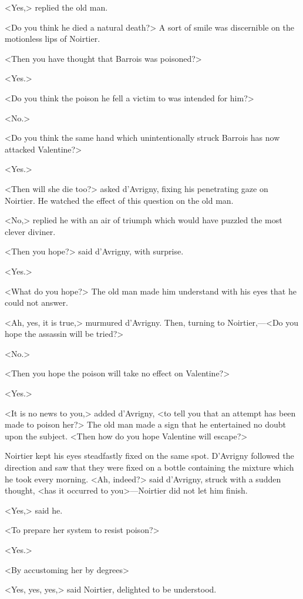  <Yes,> replied the old man. 

 <Do you think he died a natural death?> A sort of smile was discernible on the motionless lips of Noirtier. 

 <Then you have thought that Barrois was poisoned?> 

 <Yes.> 

 <Do you think the poison he fell a victim to was intended for him?> 

 <No.> 

 <Do you think the same hand which unintentionally struck Barrois has now attacked Valentine?> 

 <Yes.> 

 <Then will she die too?> asked d'Avrigny, fixing his penetrating gaze on Noirtier. He watched the effect of this question on the old man. 

 <No,> replied he with an air of triumph which would have puzzled the most clever diviner. 

 <Then you hope?> said d'Avrigny, with surprise. 

 <Yes.> 

 <What do you hope?> The old man made him understand with his eyes that he could not answer. 

 <Ah, yes, it is true,> murmured d'Avrigny. Then, turning to Noirtier,—<Do you hope the assassin will be tried?> 

 <No.> 

 <Then you hope the poison will take no effect on Valentine?> 

 <Yes.> 

 <It is no news to you,> added d'Avrigny, <to tell you that an attempt has been made to poison her?> The old man made a sign that he entertained no doubt upon the subject. <Then how do you hope Valentine will escape?> 

 Noirtier kept his eyes steadfastly fixed on the same spot. D'Avrigny followed the direction and saw that they were fixed on a bottle containing the mixture which he took every morning. <Ah, indeed?> said d'Avrigny, struck with a sudden thought, <has it occurred to you>—Noirtier did not let him finish. 

 <Yes,> said he. 

 <To prepare her system to resist poison?> 

 <Yes.> 

 <By accustoming her by degrees\longdash> 

 <Yes, yes, yes,> said Noirtier, delighted to be understood. 

